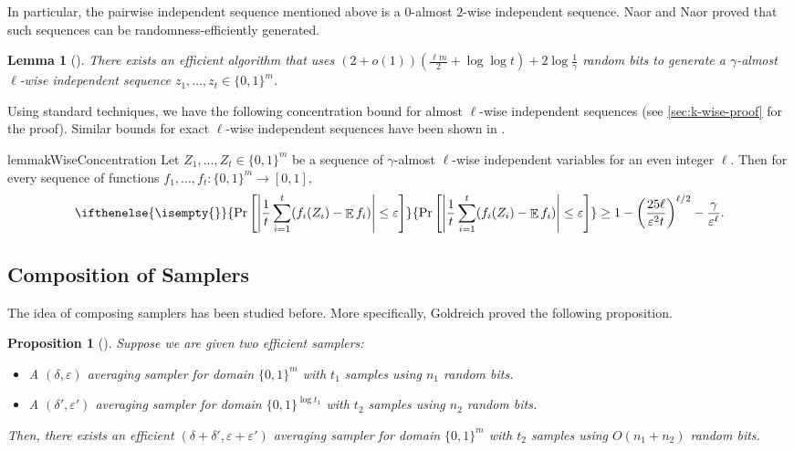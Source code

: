 \documentclass[11pt,letterpaper]{article}
\newtheorem{lemma}[theorem]{Lemma}
\newtheorem{proposition}[theorem]{Proposition}
\DeclareMathOperator*{\E}{\mathbb{E}}
\newcommand{\eps}{\varepsilon}
\newcommand{\1}{\mathbbm{1}}
\newcommand{\abs}[1]{\left|#1\right| }
\newcommand{\tuple}[1]{\left(#1\right)}
\newcommand{\zo}{\{0, 1\}}
\newcommand{\Prb}[2][]{ \ifthenelse{\isempty{#1}}
  {\Pr\left[#2\right]}
  {\Pr_{#1}\left[#2\right]} }
\begin{document}
In particular, the pairwise independent sequence mentioned above is a $0$-almost $2$-wise independent  sequence. Naor and Naor proved that such sequences can be randomness-efficiently generated.

\begin{lemma}[\cite{alon92}]
    \label{lem:k_wise_complexity}
    There exists an efficient algorithm that uses 
    $(2 + o(1))(\frac{\ell m}{2} + \log\log t) + 2 \log \frac{1}{\gamma}$ 
    random bits to generate a $\gamma$-almost $\ell$-wise independent  sequence $z_1, \dots, z_t \in \zo^m$.
\end{lemma}

Using standard techniques, we have the following concentration bound for almost $\ell$-wise independent  sequences (see \cref{sec:k-wise-proof} for the proof). Similar bounds for exact $\ell$-wise independent  sequences have been shown in \cite{bellare1994randomness, DodisThesis}. 

\begin{restatable}{lemma}{kWiseConcentration}
    \label{lem:k_wise_concentration}
    Let $Z_1, \dots, Z_t \in \zo^m$ be a sequence of $\gamma$-almost $\ell$-wise independent  variables for an even integer $\ell$. Then for every sequence of functions $f_1, \dots, f_t : \zo^m \to [0, 1]$, \[
        \Prb{\abs{\frac{1}{t}\sum_{i=1}^t (f_i(Z_i) - \E f_i)} \le \eps} \ge 1 - \tuple{\frac{25{\ell}}{\eps^2{t}}}^{\ell/2} - \frac{\gamma}{\eps^\ell}.
    \]
\end{restatable}

\subsection{Composition of Samplers}
The idea of composing samplers has been studied before. More specifically, Goldreich proved the following proposition.
\begin{proposition}[]
\label{prop:concatenation}
Suppose we are given two efficient samplers:
\begin{itemize}
    \item A $(\delta, \eps)$ averaging sampler for domain $\zo^m$ with $t_1$ samples using $n_1$ random bits.
    \item A $(\delta', \eps')$ averaging sampler for domain $\zo^{\log t_1}$ with $t_2$ samples using $n_2$ random bits.
\end{itemize}
Then, there exists an efficient $(\delta + \delta', \eps + \eps')$ averaging sampler for domain $\zo^m$ with $t_2$ samples using $O(n_1 + n_2)$ random bits. 
\end{proposition}
\end{document}
